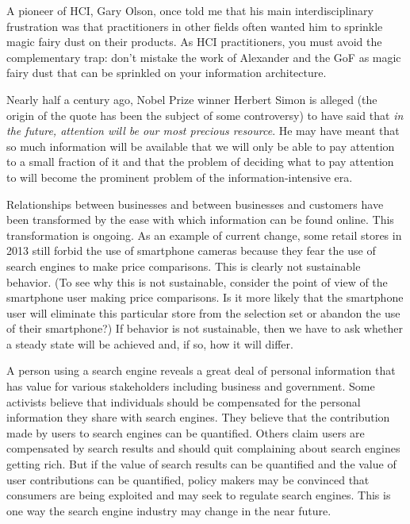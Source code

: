 \hypertarget{magic-fairy-dust}{%
\label{magic-fairy-dust}}

A pioneer of HCI, Gary Olson, once told me that his main
interdisciplinary frustration was that practitioners in other fields
often wanted him to sprinkle magic fairy dust on their products. As HCI
practitioners, you must avoid the complementary trap: don't mistake the
work of Alexander and the GoF as magic fairy dust that can be sprinkled
on your information architecture.

\hypertarget{finding-information}{%
\label{finding-information}}

Nearly half a century ago, Nobel Prize winner Herbert Simon is alleged
(the origin of the quote has been the subject of some controversy) to
have said that \emph{in the future, attention will be our most precious
resource}. He may have meant that so much information will be available
that we will only be able to pay attention to a small fraction of it and
that the problem of deciding what to pay attention to will become the
prominent problem of the information-intensive era.

Relationships between businesses and between businesses and customers
have been transformed by the ease with which information can be found
online. This transformation is ongoing. As an example of current change,
some retail stores in 2013 still forbid the use of smartphone cameras
because they fear the use of search engines to make price comparisons.
This is clearly not sustainable behavior. (To see why this is not
sustainable, consider the point of view of the smartphone user making
price comparisons. Is it more likely that the smartphone user will
eliminate this particular store from the selection set or abandon the
use of their smartphone?) If behavior is not sustainable, then we have
to ask whether a steady state will be achieved and, if so, how it will
differ.

\hypertarget{search-engines}{%
\label{search-engines}}

A person using a search engine reveals a great deal of personal
information that has value for various stakeholders including business
and government. Some activists believe that individuals should be
compensated for the personal information they share with search engines.
They believe that the contribution made by users to search engines can
be quantified. Others claim users are compensated by search results and
should quit complaining about search engines getting rich. But if the
value of search results can be quantified and the value of user
contributions can be quantified, policy makers may be convinced that
consumers are being exploited and may seek to regulate search engines.
This is one way the search engine industry may change in the near
future.

